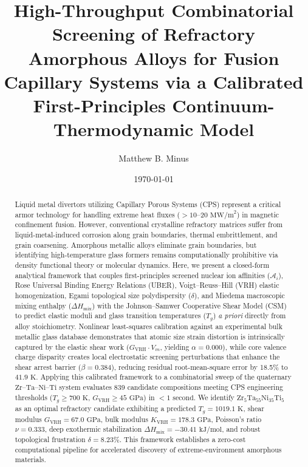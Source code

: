 \documentclass[aps,prmaterials,reprint,superscriptaddress,amsmath,amssymb,floatfix]{revtex4-2}
\begin{document}
\title{High-Throughput Combinatorial Screening of Refractory Amorphous Alloys for Fusion Capillary Systems via a Calibrated First-Principles Continuum-Thermodynamic Model}

\author{Matthew B. Minus}

\date{\today}

\begin{abstract}
Liquid metal divertors utilizing Capillary Porous Systems (CPS) represent a critical armor technology for handling extreme heat fluxes ($>10$--$20\text{ MW/m}^2$) in magnetic confinement fusion. However, conventional crystalline refractory matrices suffer from liquid-metal-induced corrosion along grain boundaries, thermal embrittlement, and grain coarsening. Amorphous metallic alloys eliminate grain boundaries, but identifying high-temperature glass formers remains computationally prohibitive via density functional theory or molecular dynamics. Here, we present a closed-form analytical framework that couples first-principles screened nuclear ion affinities ($\mathcal{A}_i$), Rose Universal Binding Energy Relations (UBER), Voigt--Reuss--Hill (VRH) elastic homogenization, Egami topological size polydispersity ($\delta$), and Miedema macroscopic mixing enthalpy ($\Delta H_{\text{mix}}$) with the Johnson--Samwer Cooperative Shear Model (CSM) to predict elastic moduli and glass transition temperatures ($T_g$) \textit{a priori} directly from alloy stoichiometry. Nonlinear least-squares calibration against an experimental bulk metallic glass database demonstrates that atomic size strain distortion is intrinsically captured by the elastic shear work ($G_{\text{VRH}} \cdot V_m$, yielding $\alpha = 0.000$), while core valence charge disparity creates local electrostatic screening perturbations that enhance the shear arrest barrier ($\beta = 0.384$), reducing residual root-mean-square error by 18.5\% to $41.9\text{ K}$. Applying this calibrated framework to a combinatorial sweep of the quaternary $\text{Zr--Ta--Ni--Ti}$ system evaluates 839 candidate compositions meeting CPS engineering thresholds ($T_g \ge 700\text{ K}$, $G_{\text{VRH}} \ge 45\text{ GPa}$) in $<1\text{ second}$. We identify $\text{Zr}_5\text{Ta}_{55}\text{Ni}_{35}\text{Ti}_5$ as an optimal refractory candidate exhibiting a predicted $T_g = 1019.1\text{ K}$, shear modulus $G_{\text{VRH}} = 67.0\text{ GPa}$, bulk modulus $K_{\text{VRH}} = 178.3\text{ GPa}$, Poisson's ratio $\nu = 0.333$, deep exothermic stabilization $\Delta H_{\text{mix}} = -30.41\text{ kJ/mol}$, and robust topological frustration $\delta = 8.23\%$. This framework establishes a zero-cost computational pipeline for accelerated discovery of extreme-environment amorphous materials.
\end{abstract}
\end{document}
